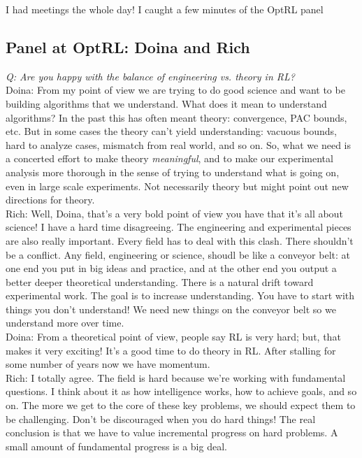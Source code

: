 I had meetings the whole day! I caught a few minutes of the OptRL panel

\subsection{Panel at OptRL: Doina and Rich}

{\it Q: Are you happy with the balance of engineering vs. theory in RL?} \\

Doina: From my point of view we are trying to do good science and want to be building algorithms that we understand. What does it mean to understand algorithms? In the past this has often meant theory: convergence, PAC bounds, etc. But in some cases the theory can't yield understanding: vacuous bounds, hard to analyze cases, mismatch from real world, and so on. So, what we need is a concerted effort to make theory {\it meaningful}, and to make our experimental analysis more thorough in the sense of trying to understand what is going on, even in large scale experiments. Not necessarily theory but might point out new directions for theory. \\

Rich: Well, Doina, that's a very bold point of view you have that it's all about science! I have a hard time disagreeing. The engineering and experimental pieces are also really important. Every field has to deal with this clash. There shouldn't be a conflict. Any field, engineering or science, shoudl be like a conveyor belt: at one end you put in big ideas and practice, and at the other end you output a better deeper theoretical understanding. There is a natural drift toward experimental work. The goal is to increase understanding. You have to start with things you don't understand! We need new things on the conveyor belt so we understand more over time. \\

Doina: From a theoretical point of view, people say RL is very hard; but, that makes it very exciting! It's a good time to do theory in RL. After stalling for some number of years now we have momentum. \\

Rich: I totally agree. The field is hard because we're working with fundamental questions. I think about it as how intelligence works, how to achieve goals, and so on. The more we get to the core of these key problems, we should expect them to be challenging. Don't be discouraged when you do hard things! The real conclusion is that we have to value incremental progress on hard problems. A small amount of fundamental progress is a big deal. \\

